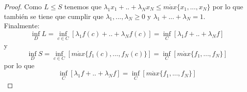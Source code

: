 \begin{proof}
		Como $ L \leq S $ tenemos que $ \lambda_1 x_1 + ..+ \lambda_N x_N \leq m\acute{a}x \{x_1, ..., x_N\} $
		por lo que también se tiene que cumplir que $ \lambda_1, ..., \lambda_N \geq 0$ y $ \lambda_1+ ...+ \lambda_N = 1$. \\
		
		Finalmente:
		\[
		\inf_D L = \inf_{c\in C} \left[ \lambda_1 f(c) + ..+ \lambda_N f(c) \right] = \inf_{C} \left[ \lambda_1 f + ..+ \lambda_N f \right]
		\]
		y
		\[
		\inf_D S = \inf_{c\in C} \left[ m\acute{a}x \{f_1(c), ..., f_N(c)\} \right] = \inf_C\left[ m\acute{a}x \{f_1, ..., f_N\}\right] 
		\]
		por lo que 
		\[ \inf_{C} \left[ \lambda_1 f + ..+ \lambda_N f \right] = \inf_C\left[ m\acute{a}x \{f_1, ..., f_N\}\right]  \] 
	\end{proof}

